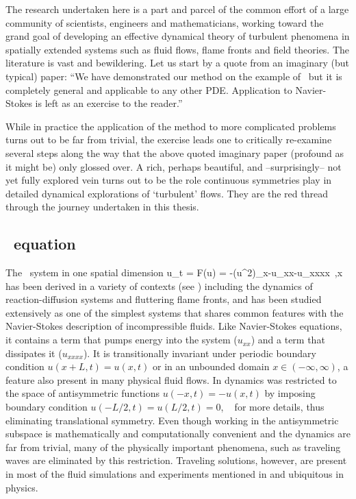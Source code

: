 The research undertaken here is a part and parcel of the
common effort of a large community of scientists, engineers and
mathematicians, working toward the grand goal of developing an effective
dynamical theory of turbulent phenomena in spatially extended systems
such as fluid flows, flame fronts and field theories.
The literature is vast and bewildering. Let us start by a
quote from an imaginary (but typical) paper: ``We have
demonstrated our method on the example of \KSe\ but it is completely
general and applicable to any other PDE. Application to
Navier-Stokes is left as an exercise to the reader.''

While in practice the application of the method to more
complicated problems turns out to be far from trivial, the
exercise leads one to critically re-examine several steps
along the way that the above quoted imaginary paper (profound
as it might be) only glossed over. A rich, perhaps beautiful,
and --surprisingly--  not yet fully explored vein turns out
to be the role continuous symmetries play in detailed
dynamical explorations of `turbulent' flows. They are the red
thread through the journey undertaken in this thesis.


\subsection{\KS\ equation}

The \KS\ system in one spatial dimension
\beq
  u_t = F(u) = -{\textstyle{}}(u^2)_x-u_{xx}-u_{xxxx}
    \,,\qquad   x \in [-L/2,L/2]
has been derived in a variety of contexts (see
) including the dynamics of
reaction-diffusion systems and fluttering flame fronts, and
has been studied extensively as one of the simplest systems
that shares common features with the Navier-Stokes
description of incompressible fluids. Like Navier-Stokes
equations, it contains a term that pumps energy into the
system ($u_{xx}$) and a term that dissipates it ($u_{xxxx}$).
It is transitionally invariant under periodic boundary
condition $u(x+L,t)=u(x,t)$ or in an unbounded domain
$x\in(-\infty,\infty)$, a feature also present in many
physical fluid flows. In
 dynamics was
restricted to the space of antisymmetric functions
$u(-x,t)=-u(x,t)$ by imposing boundary condition
$u(-L/2,t)=u(L/2,t)=0$, \cf\  for more
details, thus eliminating translational symmetry. Even though
working in the antisymmetric subspace is mathematically and
computationally convenient and the dynamics are far from
trivial, many of the physically important phenomena, such as
traveling waves are eliminated by this restriction. Traveling
solutions, however, are present in most of the fluid
simulations and experiments mentioned in  and
ubiquitous in physics.

